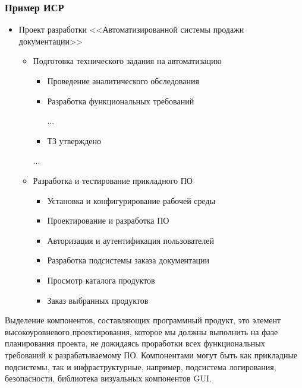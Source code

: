 \documentclass{../industrial-development}
\begin{document}
    \begin{frame} \frametitle{Пример ИСР}
        \begin{itemize}
            \item Проект разработки <<Автоматизированной системы продажи документации>>
            \begin{itemize}
                \item Подготовка технического задания на автоматизацию
                \begin{itemize}
                    \item Проведение аналитического обследования
                    \item Разработка функциональных требований

                    ...
                    \item ТЗ утверждено 
                \end{itemize}
                ...
                \item Разработка и тестирование прикладного ПО
                \begin{itemize}
                    \item Установка и конфигурирование рабочей среды
                    \item Проектирование и разработка ПО
                    \item Авторизация и аутентификация пользователей
                    \item Разработка подсистемы заказа документации
                    \item Просмотр каталога продуктов
                    \item Заказ выбранных продуктов
                \end{itemize}
            \end{itemize}
        \end{itemize}
    \end{frame}
    \lecturenotes    
    Выделение компонентов, составляющих программный продукт, это элемент высокоуровневого проектирования, которое мы должны выполнить на фазе планирования проекта, не дожидаясь проработки всех функциональных требований к разрабатываемому ПО. Компонентами могут быть как прикладные подсистемы, так и инфраструктурные, например, подсистема логирования, безопасности, библиотека визуальных компонентов GUI.
\end{document}
